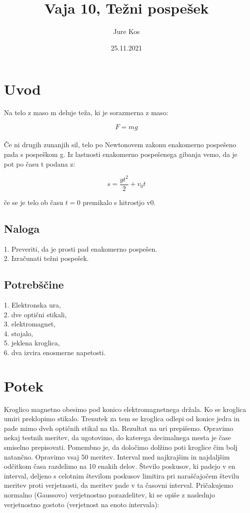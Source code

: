 \documentclass[a4paper]{report}
\author{Jure Kos}
\title{Vaja 10, Težni pospešek}
\date{25.11.2021}
\begin{document}
\maketitle

\chapter*{Uvod}
Na telo z maso m deluje teža, ki je sorazmerna z maso:

\[F = mg\]\\

Če ni drugih zunanjih sil, telo po Newtonovem zakonu enakomerno pospešeno pada s pospeškom g. Iz lastnosti enakomerno pospešenega gibanja vemo, da je pot po času t podana z:

\[s=\frac{gt^2}{2}+v_0t\]

če se je telo ob času $t = 0$ premikalo s hitrostjo v0.

\section{Naloga}
1. Preveriti, da je prosti pad enakomerno pospešen.\\
2. Izračunati težni pospešek.\\

\section{Potrebščine}
1. Elektronska ura,\\
2. dve optični stikali,\\
3. elektromagnet,\\
4. stojalo,\\
5. jeklena kroglica,\\
6. dva izvira enosmerne napetosti.

\chapter*{Potek}
Kroglico magnetno obesimo pod konico elektromagnetnega držala. Ko se kroglica umiri preklopimo stikalo. Trenutek za tem se kroglica odlepi od konice jedra in pade mimo dveh optičnih stikal na tla. Rezultat na uri prepišemo. Opravimo nekaj testnih meritev, da ugotovimo, do katerega decimalnega mesta je čase smiselno prepisovati. Pomembno je, da določimo dolžino poti kroglice čim bolj natančno. Opravimo vsaj 50 meritev. Interval med najkrajšim in najdaljšim odčitkom časa razdelimo na 10 enakih delov. Število poskusov, ki padejo v en interval, deljeno
s celotnim številom poskusov limitira pri naraščajočem številu meritev proti verjetnosti, da meritev pade v ta časovni interval. Pričakujemo normalno (Gaussovo)
verjetnostno porazdelitev, ki se opiše z naslednjo verjetnostno gostoto (verjetnost
na enoto intervala):
\end{document}
